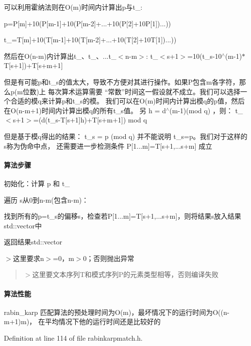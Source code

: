 可以利用霍纳法则在\+O(m)时间内计算出p与t\+\_\+:


\begin{DoxyItemize}
\item p=P\mbox{[}m\mbox{]}+10(P\mbox{[}m-\/1\mbox{]}+10(P\mbox{[}m-\/2\mbox{]}+...+10(P\mbox{[}2\mbox{]}+10\+P\mbox{[}1\mbox{]})...))
\item t\+\_=T\mbox{[}m\mbox{]}+10(T\mbox{[}m-\/1\mbox{]}+10(T\mbox{[}m-\/2\mbox{]}+...+10(T\mbox{[}2\mbox{]}+10\+T\mbox{[}1\mbox{]})...))
\end{DoxyItemize}

然后在\+O(n-\/m)内计算出t\+\_、t\+\_、...t\+\_\+$<$n-\/m$>$\+: t\+\_\+$<$s+1$>$=10(t\+\_\+s-\/10$^\wedge$(m-\/1)$\ast$\+T\mbox{[}s+1\mbox{]})+\+T\mbox{[}s+m+1\mbox{]}

但是有可能p和t\+\_\+s的值太大，导致不方便对其进行操作。如果\+P包含m各字符，那么p(m位数)上 每次算术运算需要 “常数”时间这一假设就不成立。我们可以选择一个合适的模q来计算p和t\+\_\+s的模。 我们可以在\+O(m)时间内计算出模q的p值，然后在\+O(n-\/m+1)时间内计算出模q的所有t\+\_\+s值。 另 h = d$^\wedge$(m-\/1)(mod q) ，则： t\+\_\+$<$s+1$>$=(d(t\+\_\+s-\/\+T\mbox{[}s+1\mbox{]}h)+\+T\mbox{[}s+m+1\mbox{]}) mod q

但是基于模q得出的结果： t\+\_\+s = p (mod q) 并不能说明 t\+\_\+s=p。我们对于这样的s称为伪命中点， 还需要进一步检测条件 P\mbox{[}1...m\mbox{]}=T\mbox{[}s+1,...s+m\mbox{]} 成立

\paragraph*{算法步骤}


\begin{DoxyItemize}
\item 初始化：计算 p 和 t\+\_
\item 遍历 s从0到n-\/m(包含n-\/m)：
\begin{DoxyItemize}
\item 找到所有的p=t\+\_\+s的偏移s，检查若\+P\mbox{[}1...m\mbox{]}=T\mbox{[}s+1,...s+m\mbox{]}，则将结果s放入结果std\+::vector中
\end{DoxyItemize}
\item 返回结果std\+::vector
\end{DoxyItemize}

$>$这里要求n$>$=0，m$>$0；否则抛出异常 \begin{quote}


$>$这里要文本序列\+T和模式序列\+P的元素类型相等，否则编译失败 \end{quote}


\paragraph*{算法性能}

rabin\+\_\+karp 匹配算法的预处理时间为\+O(m)，最坏情况下的运行时间为\+O((n-\/m+1)m)， 在平均情况下他的运行时间还是比较好的 

Definition at line 114 of file rabinkarpmatch.\+h.

